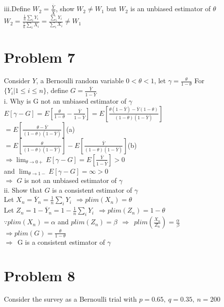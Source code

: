 \documentclass[11pt, oneside]{article}   	%
\begin{document}
iii.Define $W_2=\frac{\overline{Y}}{\overline{X}}$, show $W_2 \neq W_1$ but $W_2$ is an unbiased estimator of $\theta$\\
$W_2=\frac{\frac{1}{n}\sum_i Y_i}{\frac{1}{n}\sum_i X_i}=\frac{\sum_i Y_i}{\sum_i X_i}\neq W_1$\\


\section{Problem 7}
Consider $Y$, a Bernoulli random variable $0<\theta<1$, let $\gamma=\frac{\theta}{1-\theta}$
For $\{Y_i | 1\leq i \leq n\}$, define $G=\frac{\overline{Y}}{1-\overline{Y}}$\\

i. Why is G not an unbiased estimator of $\gamma$\\
$E[\gamma-G]=E[\frac{\theta}{1-\theta}-\frac{\overline{Y}}{1-\overline{Y}}]=E[\frac{\theta(1-\overline{Y})-\overline{Y}(1-\theta)}{(1-\theta)(1-\overline{Y})}]$\\
\indent$=E[\frac{\theta-\overline{Y}}{(1-\theta)(1-\overline{Y})}]$\hfill(a)\\
\indent$=E[\frac{\theta}{(1-\theta)(1-\overline{Y})}]-E[\frac{\overline{Y}}{(1-\theta)(1-\overline{Y})}]$\hfill(b)\\
$\Rightarrow \lim_{\theta\rightarrow 0+}E[\gamma-G]=E[\frac{\overline{Y}}{1-\overline{Y}}]>0$\\
and \indent$\lim_{\theta\rightarrow 1-}E[\gamma-G]=\infty>0$\\
\indent$\Rightarrow$ $G$ is not an unbiased estimator of $\gamma$\\

ii. Show that $G$ is a consistent estimator of $\gamma$\\
Let $X_n=\overline{Y}_n=\frac{1}{n}\sum_i Y_i\ \ \Rightarrow plim(X_n)=\theta$\\
Let $Z_n=1-\overline{Y}_n=1-\frac{1}{n}\sum_i Y_i\ \ \Rightarrow plim(Z_n)=1-\theta$\\
\indent$\because plim(X_n)=\alpha$ and $plim(Z_n)=\beta\ \ \Rightarrow\ \ plim(\frac{X_n}{Z_n})=\frac{\alpha}{\beta}$\\
\indent$\Rightarrow plim(G)=\frac{\theta}{1-\theta}$\\
\indent$\Rightarrow\ \ $G is a consistent estimator of $\gamma$\\

\section{Problem 8}
Consider the survey as a Bernoulli trial with $p=0.65,\ q=0.35,\ n=200$\\
\end{document}
